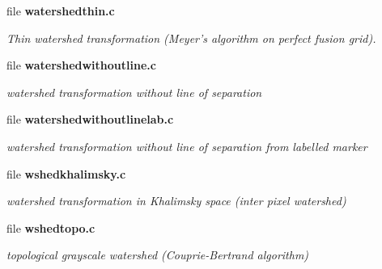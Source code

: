 \begin{CompactItemize}
\item 
file {\bf watershedthin.c}
\begin{CompactList}\small\item\em Thin watershed transformation (Meyer's algorithm on perfect fusion grid). \item\end{CompactList}

\item 
file {\bf watershedwithoutline.c}
\begin{CompactList}\small\item\em watershed transformation without line of separation \item\end{CompactList}

\item 
file {\bf watershedwithoutlinelab.c}
\begin{CompactList}\small\item\em watershed transformation without line of separation from labelled marker \item\end{CompactList}

\item 
file {\bf wshedkhalimsky.c}
\begin{CompactList}\small\item\em watershed transformation in Khalimsky space (inter pixel watershed) \item\end{CompactList}

\item 
file {\bf wshedtopo.c}
\begin{CompactList}\small\item\em topological grayscale watershed (Couprie-Bertrand algorithm) \item\end{CompactList}

\end{CompactItemize}
